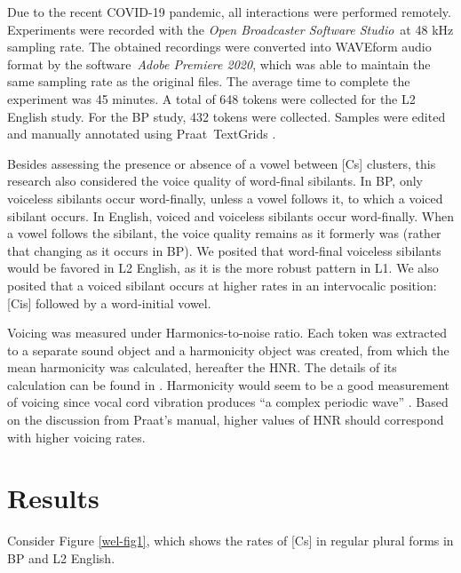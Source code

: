 Due to the recent COVID-19 pandemic, all interactions were performed
remotely. Experiments were recorded with the \emph{Open Broadcaster
Software Studio}~at 48 kHz sampling rate. The obtained recordings were
converted into WAVEform audio format by the software~\emph{Adobe
Premiere 2020}, which was able to maintain the same sampling rate as the
original files. The average time to complete the experiment was 45 minutes. 
A total of 648 tokens were collected for the L2 English study.
For the BP study, 432 tokens were collected. Samples were edited and
manually annotated using Praat~TextGrids \citep{boersma2019}.

Besides assessing the presence or absence of a vowel between {[}Cs{]}
clusters, this research also considered the voice quality of word-final
sibilants. In BP, only voiceless sibilants occur word-finally, unless a
vowel follows it, to which a voiced sibilant occurs. In English, voiced
and voiceless sibilants occur word-finally. When a vowel follows the
sibilant, the voice quality remains as it formerly was (rather that
changing as it occurs in BP). We posited that word-final voiceless
sibilants would be favored in L2 English, as it is the more robust
pattern in L1. We also posited that a voiced sibilant occurs at higher
rates in an intervocalic position: {[}Cis{]} followed by a word-initial
vowel.

Voicing was measured under Harmonics-to-noise ratio. Each token was
extracted to a separate sound object and a harmonicity object was
created, from which the mean harmonicity was calculated, hereafter the
HNR. The details of its calculation can be found in \citet{Boersma93}.
Harmonicity would seem to be a good measurement of voicing since vocal
cord vibration produces ``a complex periodic wave'' \citep[p.~63]{johnson1997}. 
Based on the discussion from Praat's manual, higher values of HNR
should correspond with higher voicing rates.



\section{Results}

Consider Figure \ref{wel-fig1}, which shows the rates of {[}Cs{]} in regular plural
forms in BP and L2 English.


